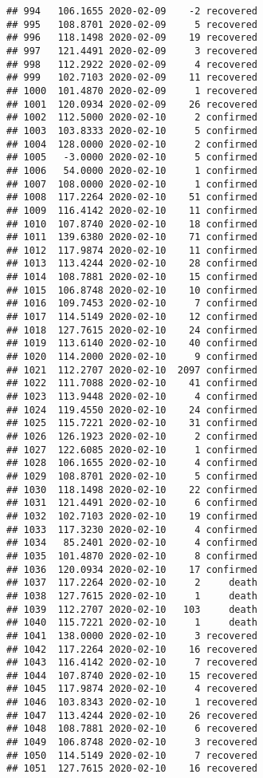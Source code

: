 \documentclass[
]{article}
\begin{document}
\begin{verbatim}
## 994   106.1655 2020-02-09    -2 recovered
## 995   108.8701 2020-02-09     5 recovered
## 996   118.1498 2020-02-09    19 recovered
## 997   121.4491 2020-02-09     3 recovered
## 998   112.2922 2020-02-09     4 recovered
## 999   102.7103 2020-02-09    11 recovered
## 1000  101.4870 2020-02-09     1 recovered
## 1001  120.0934 2020-02-09    26 recovered
## 1002  112.5000 2020-02-10     2 confirmed
## 1003  103.8333 2020-02-10     5 confirmed
## 1004  128.0000 2020-02-10     2 confirmed
## 1005   -3.0000 2020-02-10     5 confirmed
## 1006   54.0000 2020-02-10     1 confirmed
## 1007  108.0000 2020-02-10     1 confirmed
## 1008  117.2264 2020-02-10    51 confirmed
## 1009  116.4142 2020-02-10    11 confirmed
## 1010  107.8740 2020-02-10    18 confirmed
## 1011  139.6380 2020-02-10    71 confirmed
## 1012  117.9874 2020-02-10    11 confirmed
## 1013  113.4244 2020-02-10    28 confirmed
## 1014  108.7881 2020-02-10    15 confirmed
## 1015  106.8748 2020-02-10    10 confirmed
## 1016  109.7453 2020-02-10     7 confirmed
## 1017  114.5149 2020-02-10    12 confirmed
## 1018  127.7615 2020-02-10    24 confirmed
## 1019  113.6140 2020-02-10    40 confirmed
## 1020  114.2000 2020-02-10     9 confirmed
## 1021  112.2707 2020-02-10  2097 confirmed
## 1022  111.7088 2020-02-10    41 confirmed
## 1023  113.9448 2020-02-10     4 confirmed
## 1024  119.4550 2020-02-10    24 confirmed
## 1025  115.7221 2020-02-10    31 confirmed
## 1026  126.1923 2020-02-10     2 confirmed
## 1027  122.6085 2020-02-10     1 confirmed
## 1028  106.1655 2020-02-10     4 confirmed
## 1029  108.8701 2020-02-10     5 confirmed
## 1030  118.1498 2020-02-10    22 confirmed
## 1031  121.4491 2020-02-10     6 confirmed
## 1032  102.7103 2020-02-10    19 confirmed
## 1033  117.3230 2020-02-10     4 confirmed
## 1034   85.2401 2020-02-10     4 confirmed
## 1035  101.4870 2020-02-10     8 confirmed
## 1036  120.0934 2020-02-10    17 confirmed
## 1037  117.2264 2020-02-10     2     death
## 1038  127.7615 2020-02-10     1     death
## 1039  112.2707 2020-02-10   103     death
## 1040  115.7221 2020-02-10     1     death
## 1041  138.0000 2020-02-10     3 recovered
## 1042  117.2264 2020-02-10    16 recovered
## 1043  116.4142 2020-02-10     7 recovered
## 1044  107.8740 2020-02-10    15 recovered
## 1045  117.9874 2020-02-10     4 recovered
## 1046  103.8343 2020-02-10     1 recovered
## 1047  113.4244 2020-02-10    26 recovered
## 1048  108.7881 2020-02-10     6 recovered
## 1049  106.8748 2020-02-10     3 recovered
## 1050  114.5149 2020-02-10     7 recovered
## 1051  127.7615 2020-02-10    16 recovered

\end{verbatim}
\end{document}
